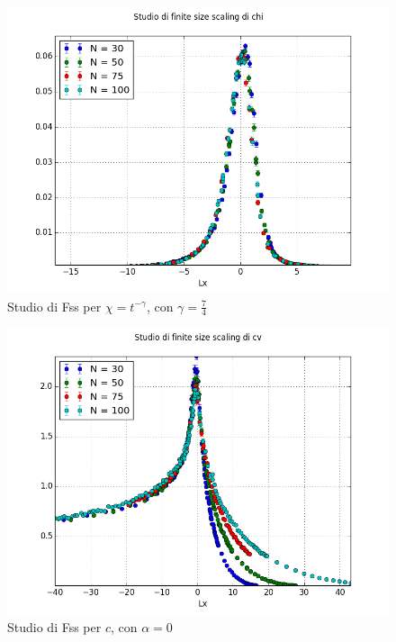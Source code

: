 \begin{center}
	\begin{figure}[h]
		\includegraphics[scale=0.56]{sw/fsschi.png}
		\caption{Studio di Fss per $\chi = t^{-\gamma}$, con $\gamma = \frac{7}{4}$}
	\end{figure}
\end{center}
\begin{center}
	\begin{figure}[h]
		\includegraphics[scale=0.56]{sw/fsscv.png}
		\caption{Studio di Fss per $c$, con $\alpha=0$}
	\end{figure}
\end{center}
